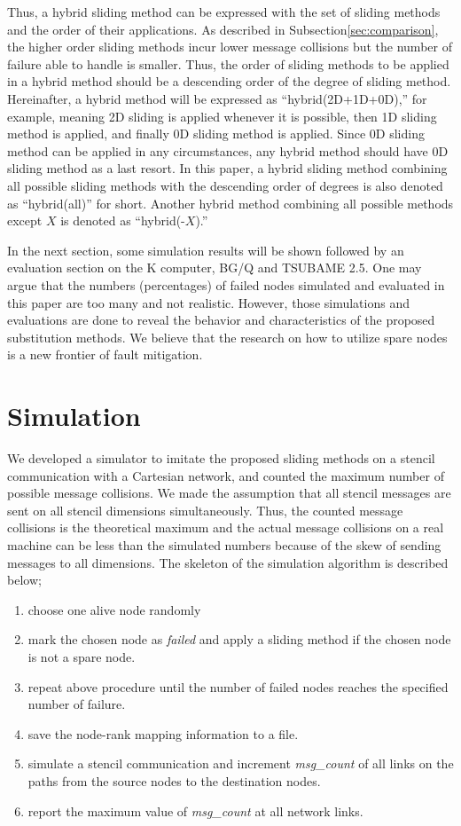 \documentclass[Afour,times,sageh]{sagej}
\begin{document}
Thus, a hybrid sliding method can be expressed with the set of sliding
methods and the order of their applications. As described in
Subsection\ref{sec:comparison}, the higher order sliding methods incur
lower message collisions but the number of failure able to
handle is smaller. Thus, the order of sliding methods to be applied in
a hybrid method should be a descending order of the degree of sliding
method. Hereinafter, a hybrid method will be expressed as
``hybrid(2D+1D+0D),'' for example, meaning 2D sliding is applied
whenever it is possible, then 1D sliding method is applied, and
finally 0D sliding method is applied. Since 0D sliding method can be
applied in any circumstances, any hybrid method should have 0D sliding
method as a last resort. In this paper, a hybrid sliding method
combining all possible sliding methods with the descending order of
degrees is also denoted as ``hybrid(all)'' for short. Another hybrid
method combining all possible methods except $X$ is denoted as
``hybrid(-$X$).''

In the next section, some simulation results will be shown followed by
an evaluation section on the K computer, BG/Q and TSUBAME
2.5\citep{tsubame}. One may
argue that the numbers (percentages) of failed nodes simulated and
evaluated in this paper are too many and not realistic. However,
those simulations and evaluations are done to reveal the behavior and
characteristics of the proposed substitution methods. We believe that
the research on how to utilize spare nodes is a new frontier of fault
mitigation.

\section{Simulation}\label{sec:sim}

We developed a simulator to imitate the proposed sliding methods on a
stencil communication with a Cartesian network, and counted the maximum
number of possible message collisions. We made the assumption that all stencil
messages are sent on all stencil dimensions simultaneously. Thus, the
counted message collisions is the theoretical maximum and the actual
message collisions on a real machine can be less than the simulated
numbers because of the skew of sending messages to all dimensions. The
skeleton of the simulation algorithm is described below;

\begin{enumerate}
\item choose one alive node randomly
\item mark the chosen node as {\it failed} and apply a sliding
  method if the chosen node is not a spare node.
\item repeat above procedure until the number of failed nodes reaches
  the specified number of failure.
\item save the node-rank mapping information to a file.
\item simulate a stencil communication and increment {\it
    msg\_count} of all links on the paths from the source nodes to the
  destination nodes.
\item report the maximum value of {\it msg\_count} at all network links.
\end{enumerate}
\end{document}
